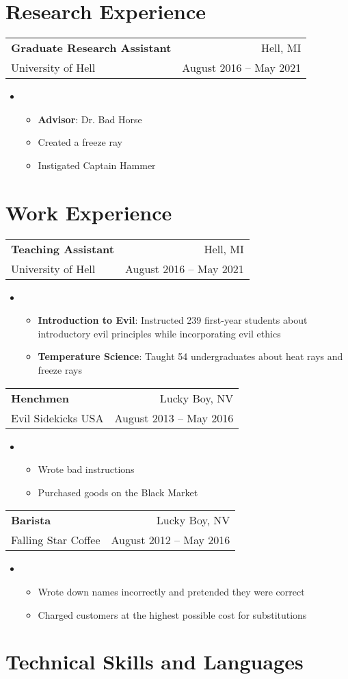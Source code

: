 \documentclass[letterpaper,12pt]{article}
\makeatletter
\newcommand{\CVListEntry}[4]{
    \begin{tabular*}{\textwidth}[t]{l@{\extracolsep{\fill}}r}
      \textbf{#1} & #2 \\
      {#3} & { #4} \\
    \end{tabular*}
}
\newcommand{\CVListStart}{\begin{itemize}[leftmargin=*]\item[]\begin{itemize}[nosep]}
\newcommand{\CVListEnd}{\end{itemize}\end{itemize}}
\makeatother
\begin{document}
\section{Research Experience}

\CVListEntry
    {Graduate Research Assistant}{Hell, MI}
    {University of Hell}{August 2016 -- May 2021}
\CVListStart
    \item \textbf{Advisor}: Dr. Bad Horse
    \item Created a freeze ray
    \item Instigated Captain Hammer
\CVListEnd

\section{Work Experience}

\CVListEntry
    {Teaching Assistant}{Hell, MI}
    {University of Hell}{August 2016 -- May 2021}
\CVListStart
    \item \textbf{Introduction to Evil}: Instructed 239 first-year students about introductory evil principles while incorporating evil ethics
    \item \textbf{Temperature Science}: Taught 54 undergraduates about heat rays and freeze rays
\CVListEnd

\CVListEntry
    {Henchmen}{Lucky Boy, NV}
    {Evil Sidekicks USA}{August 2013 -- May 2016}
\CVListStart
    \item Wrote bad instructions
    \item Purchased goods on the Black Market
\CVListEnd

\CVListEntry
    {Barista}{Lucky Boy, NV}
    {Falling Star Coffee}{August 2012 -- May 2016}
\CVListStart
    \item Wrote down names incorrectly and pretended they were correct
    \item Charged customers at the highest possible cost for substitutions
\CVListEnd

%

\section{Technical Skills and Languages}
\end{document}
